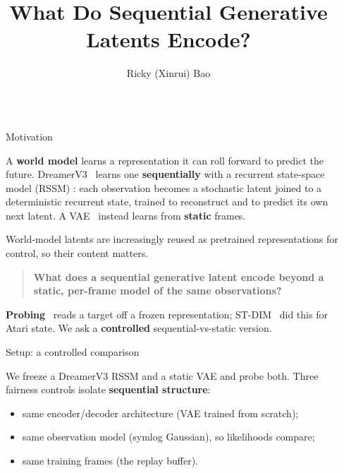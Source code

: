 \documentclass[final]{beamer}
\title{What Do Sequential Generative Latents Encode?}
\author{Ricky (Xinrui) Bao}
\institute[UChicago]{Department of Computer Science, University of Chicago}
\newlength{\sepwidth}
\newlength{\colwidth}
\newcommand{\separatorcolumn}{\begin{column}{\sepwidth}\end{column}}
\begin{document}
\begin{frame}[t]
\begin{columns}[t]
\separatorcolumn

\begin{column}{\colwidth}

  \begin{block}{Motivation}

    A \textbf{world model} learns a representation it can roll forward to
    predict the future. DreamerV3~\citep{hafner2025dreamerv3} learns one
    \textbf{sequentially} with a recurrent state-space model (RSSM)
    \citep{hafner2019planet}: each observation becomes a stochastic latent
    joined to a deterministic recurrent state, trained to reconstruct and to
    predict its own next latent. A VAE~\citep{kingma2014vae} instead learns from
    \textbf{static} frames.

    World-model latents are increasingly reused as pretrained representations
    for control, so their content matters.

    \begin{quote}
      \textbf{What does a sequential generative latent encode beyond a static,
      per-frame model of the same observations?}
    \end{quote}

    \textbf{Probing}~\citep{alain2016probes} reads a target off a frozen
    representation; ST-DIM~\citep{anand2019atari} did this for Atari state. We
    ask a \textbf{controlled} sequential-vs-static version.

  \end{block}

  \begin{block}{Setup: a controlled comparison}

    We freeze a DreamerV3 RSSM and a static VAE and probe both. Three fairness
    controls isolate \textbf{sequential structure}:

    \begin{itemize}
      \item same encoder/decoder architecture (VAE trained from scratch);
      \item same observation model (symlog Gaussian), so likelihoods compare;
      \item same training frames (the replay buffer).
    \end{itemize}


\end{block}
\end{column}
\end{columns}
\end{frame}
\end{document}
